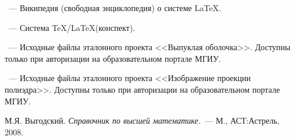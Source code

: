 \begin{thebibliography}{}

~---
Википедия (свободная энциклопедия) о системе \LaTeX.

~---
Система \TeX/\LaTeX (конспект).

~---
Исходные файлы эталонного проекта <<Выпуклая оболочка>>.
Доступны только при авторизации на образовательном портале МГИУ.

~---
Исходные файлы эталонного проекта <<Изображение проекции полиэдра>>.
Доступны только при авторизации на образовательном портале МГИУ.

М.Я. Выгодский.
{\em Справочник по высшей математике.}~---
М., АСТ:Астрель, 2008.

\end{thebibliography}

\endinput


